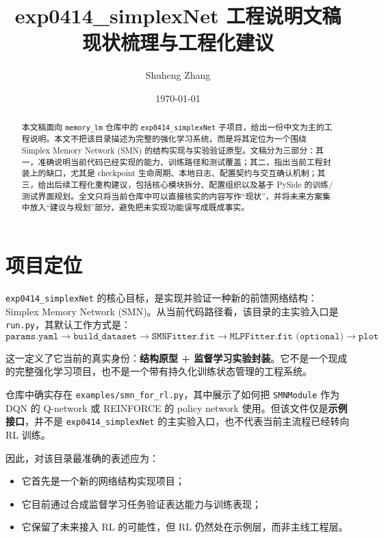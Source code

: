 \documentclass[11pt,fontset=none]{ctexart}
\title{exp0414\_simplexNet 工程说明文稿\\\large 现状梳理与工程化建议}
\author{Shuheng Zhang}
\date{\today}
\begin{document}
\maketitle

\begin{abstract}
本文稿面向 \texttt{memory\_lm} 仓库中的 \texttt{exp0414\_simplexNet} 子项目，给出一份中文为主的工程说明。本文不把该目录描述为完整的强化学习系统，而是将其定位为一个围绕 Simplex Memory Network (SMN) 的结构实现与实验验证原型。文稿分为三部分：其一，准确说明当前代码已经实现的能力、训练路径和测试覆盖；其二，指出当前工程封装上的缺口，尤其是 checkpoint 生命周期、本地日志、配置契约与交互确认机制；其三，给出后续工程化重构建议，包括核心模块拆分、配置组织以及基于 PySide 的训练/测试界面规划。全文只将当前仓库中可以直接核实的内容写作“现状”，并将未来方案集中放入“建议与规划”部分，避免把未实现功能误写成既成事实。
\end{abstract}

\tableofcontents

\section{项目定位}

\texttt{exp0414\_simplexNet} 的核心目标，是实现并验证一种新的前馈网络结构：Simplex Memory Network (SMN)。从当前代码路径看，该目录的主实验入口是 \texttt{run.py}，其默认工作方式是：
\[
\texttt{params.yaml} \rightarrow \texttt{build\_dataset} \rightarrow \texttt{SMNFitter.fit} \rightarrow \texttt{MLPFitter.fit (optional)} \rightarrow \texttt{plot}
\]

这一定义了它当前的真实身份：\textbf{结构原型 + 监督学习实验封装}。它不是一个现成的完整强化学习项目，也不是一个带有持久化训练状态管理的工程系统。

仓库中确实存在 \texttt{examples/smn\_for\_rl.py}，其中展示了如何把 \texttt{SMNModule} 作为 DQN 的 Q-network 或 REINFORCE 的 policy network 使用。但该文件仅是\textbf{示例接口}，并不是 \texttt{exp0414\_simplexNet} 的主实验入口，也不代表当前主流程已经转向 RL 训练。

因此，对该目录最准确的表述应为：
\begin{itemize}[leftmargin=2em]
  \item 它首先是一个新的网络结构实现项目；
  \item 它目前通过合成监督学习任务验证表达能力与训练表现；
  \item 它保留了未来接入 RL 的可能性，但 RL 仍然处在示例层，而非主线工程层。
\end{itemize}
\end{document}
